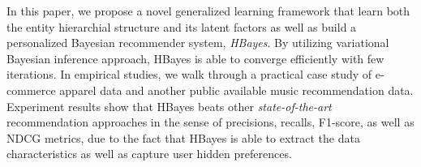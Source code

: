 In this paper, we propose a novel generalized learning framework that learn both the entity hierarchial structure and its latent factors as well as build a personalized Bayesian recommender system, \emph{HBayes}.  
By utilizing variational Bayesian inference approach, HBayes is able to converge efficiently with few iterations.  In empirical studies, we walk through a practical case study of e-commerce apparel data and another public available music recommendation data.  Experiment results show that HBayes beats other \emph{state-of-the-art} recommendation approaches in the sense of precisions, recalls, F1-score, as well as NDCG metrics, due to the fact that HBayes is able to extract the data characteristics as well as capture user hidden preferences.   